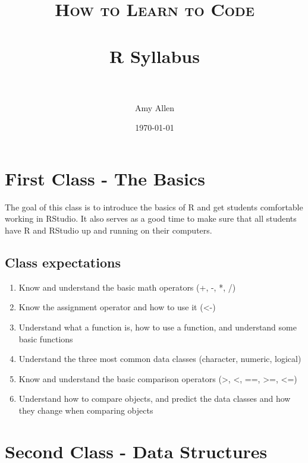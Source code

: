 \documentclass[paper=a4, fontsize=11pt]{scrartcl} %
\title{	
\normalfont \normalsize 
\textsc{How to Learn to Code} \\ [25pt] %
\horrule{0.5pt} \\[0.4cm] %
\huge R Syllabus \\ %
\horrule{2pt} \\[0.5cm] %
}
\author{Amy Allen} %
\date{\normalsize\today} %
\numberwithin{equation}{section} %
\numberwithin{figure}{section} %
\numberwithin{table}{section} %
\begin{document}
\maketitle %


\section{First Class - The Basics}

The goal of this class is to introduce the basics of R and get students comfortable working in RStudio. It also serves as a good time to make sure that all students have R and RStudio up and running on their computers. 


\subsection{Class expectations}

\begin{enumerate}
\item Know and understand the basic math operators (+, -, *, /)
\item Know the assignment operator and how to use it (<-)
\item Understand what a function is, how to use a function, and understand some basic functions
\item Understand the three most common data classes (character, numeric, logical) 
\item Know and understand the basic comparison operators (>, <, ==, >=, <=)
\item Understand how to compare objects, and predict the data classes and how they change when comparing objects 
\end{enumerate}


\section{Second Class - Data Structures}
\end{document}
